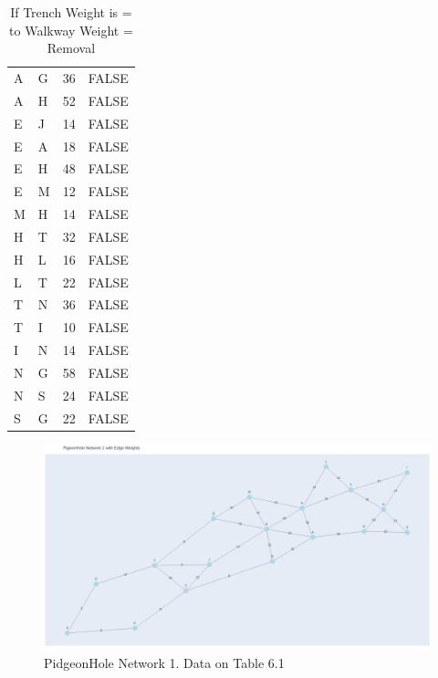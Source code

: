 \documentclass[11pt]{book}
\renewcommand{\=}[1]{\stackrel{#1}{=}} %
\theoremstyle{definition}
\theoremstyle{remark}
\begin{document}
\begin{table}[]
\begin{tabular}{llll}
A & G & 36 & FALSE \\
A & H & 52 & FALSE \\
E & J & 14 & FALSE \\
E & A & 18 & FALSE \\
E & H & 48 & FALSE \\
\rowcolor[HTML]{9AFF99} 
E & M & 12 & FALSE \\
M & H & 14 & FALSE \\
H & T & 32 & FALSE \\
H & L & 16 & FALSE \\
L & T & 22 & FALSE \\
T & N & 36 & FALSE \\
T & I & 10 & FALSE \\
\rowcolor[HTML]{9AFF99} 
I & N & 14 & FALSE \\
N & G & 58 & FALSE \\
N & S & 24 & FALSE \\
S & G & 22 & FALSE
\end{tabular}
\caption{If Trench Weight is = to Walkway Weight = Removal}
\label{tab:my-table}
\end{table}

\begin{figure}
    \centering
    \includegraphics[width=1\linewidth]{img/PigeonHole NW1.png}
    \caption{PidgeonHole Network 1. Data on Table 6.1}
    \label{fig:enter-label}
\end{figure}
\end{document}
